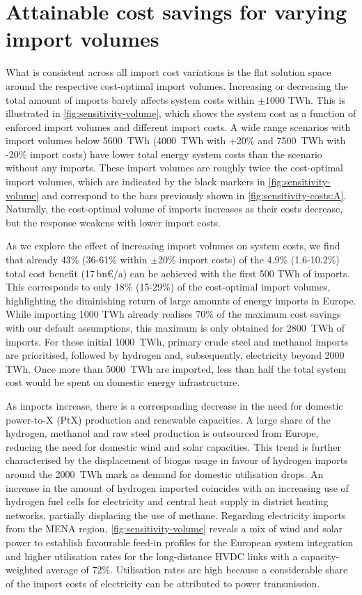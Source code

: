 \documentclass[5p,10pt]{elsarticle}
\newcommand{\bneuro}[1]{#1\,bn\euro{}/a}
\begin{document}
\section*{Attainable cost savings for varying import volumes}

What is consistent across all import cost variations is the flat solution space
around the respective cost-optimal import volumes. Increasing or decreasing the
total amount of imports barely affects system costs within $\pm 1000$ TWh. This
is illustrated in \cref{fig:sensitivity-volume}, which shows the system cost as
a function of enforced import volumes and different import costs. A wide range
scenarios with import volumes below 5600~TWh (4000~TWh with +20\% and 7500~TWh
with -20\% import costs) have lower total energy system costs than the scenario
without any imports. These import volumes are roughly twice the cost-optimal
import volumes, which are indicated by the black markers in
\cref{fig:sensitivity-volume} and correspond to the bars previously shown in
\cref{fig:sensitivity-costs:A}. Naturally, the cost-optimal volume of imports
increases as their costs decrease, but the response weakens with lower import
costs.

As we explore the effect of increasing import volumes on system costs, we find
that already 43\% (36-61\% within $\pm$20\% import costs) of the 4.9\%
(1.6-10.2\%) total cost benefit (\bneuro{17}) can be achieved with the first 500
TWh of imports. This corresponds to only 18\% (15-29\%) of the cost-optimal
import volumes, highlighting the diminishing return of large amounts of energy
imports in Europe. While importing 1000 TWh already realises 70\% of the maximum
cost savings with our default assumptions, this maximum is only obtained for
2800~TWh of imports. For these initial 1000~TWh, primary crude steel and
methanol imports are prioritised, followed by hydrogen and, subsequently,
electricity beyond 2000 TWh. Once more than 5000~TWh are imported, less than
half the total system cost would be spent on domestic energy infrastructure.

As imports increase, there is a corresponding decrease in the need for domestic
power-to-X (PtX) production and renewable capacities. A large share of the
hydrogen, methanol and raw steel production is outsourced from Europe, reducing
the need for domestic wind and solar capacities. This trend is further
characterised by the displacement of biogas usage in favour of hydrogen imports
around the 2000~TWh mark as demand for domestic  utilisation drops. An
increase in the amount of hydrogen imported coincides with an increasing use of
hydrogen fuel cells for electricity and central heat supply in district heating
networks, partially displacing the use of methane. Regarding electricity imports
from the MENA region, \cref{fig:sensitivity-volume} reveals a mix of wind and
solar power to establish favourable feed-in profiles for the European system
integration and higher utilisation rates for the long-distance HVDC links with a
capacity-weighted average of 72\%. Utilisation rates are high because a
considerable share of the import costs of electricity can be attributed to power
transmission.
\end{document}
